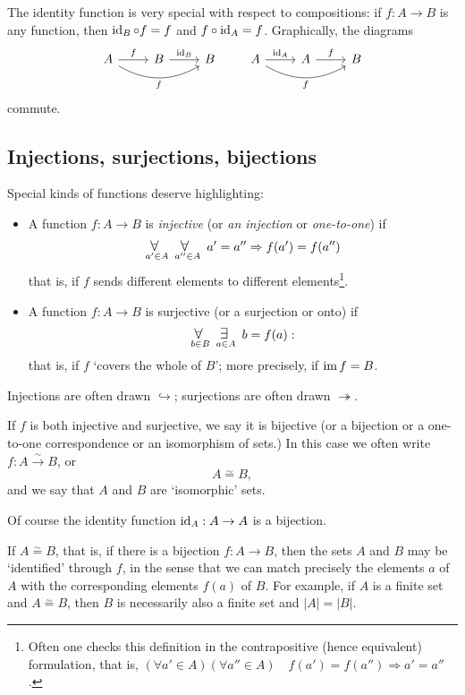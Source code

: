 The identity function is very special with respect to compositions: if
$f : A \to B$ is any function, then $\operatorname{id}_B \circ f = f$ and
$f \circ \operatorname{id}_A = f$. Graphically, the diagrams
\[
  \begin{tikzcd}
    A \arrow[r,"f"] \arrow[rr,bend right,"f"']& B \arrow[r,"\id_B"] &
    B
  \end{tikzcd}
  \qquad
  \begin{tikzcd}
    A \arrow[r,"\id_A"] \arrow[rr,bend right,"f"']& A \arrow[r,"f"]& B
  \end{tikzcd}
\]
commute.

\subsection{Injections, surjections, bijections}%
\label{subsec:prelims:injections-surjections-bijections}
Special kinds of functions deserve highlighting:
\begin{itemize}
\item A function $f : A \to B$ is \emph{injective} (or \emph{an
    injection} or \emph{one-to-one}) if
  \[\kforall_{a' \in A}\ \kforall_{a'' \in A}\
    a' = a'' \Rightarrow f(a') = f(a'')\] that is, if $f$ sends
  different elements to different elements\footnote{Often one checks
    this definition in the contrapositive (hence equivalent)
    formulation, that is,
    $(\forall a' \in A)(\forall a'' \in A) \quad f(a') = f(a'')
    \Rightarrow a' = a''$.}.
\item A function $f : A \to B$ is surjective (or a surjection or onto)
  if
  \[\kforall_{b \in B}\ \kexists_{a \in A}\ b = f(a):\]
  that is, if $f$ `covers the whole of $B$'; more precisely, if
  $\operatorname{im} f = B$.
\end{itemize}

Injections are often drawn $\hookrightarrow$; surjections are often
drawn $\twoheadrightarrow$.

If $f$ is both injective and surjective, we say it is bijective (or a
bijection or a one-to-one correspondence or an isomorphism of sets.)
In this case we often write $f : A \xrightarrow{\sim} B$, or
\[A \overset{\sim}{=} B,\] and we say that $A$ and $B$ are
`isomorphic' sets.

Of course the identity function $\operatorname{id}_A : A \to A$ is a bijection.

If $A \overset{\sim}{=} B$, that is, if there is a bijection
$f : A \to B$, then the sets $A$ and $B$ may be `identified' through
$f$, in the sense that we can match precisely the elements $a$ of $A$
with the corresponding elements $f(a)$ of $B$. For example, if $A$ is
a finite set and $A \overset{\sim}{=} B$, then $B$ is necessarily also
a finite set and $|A| = |B|$.

